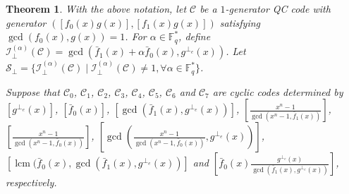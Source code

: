 \documentclass[journal]{IEEEtran}
\newtheorem{theorem}{Theorem}
\begin{document}
\begin{theorem}\label{SDQCBound} With the above notation,
	let $\mathscr{C}$ be a $1$-generator QC code with generator $(\left[f_0(x)g(x)\right],\left[f_1(x)g(x)\right])$ satisfying
 	$\gcd(f_0(x),g(x))=1$. 
  For $\alpha\in \mathbb{F}_q^*$, define $\mathcal{I}^{(\alpha)}_{\perp}(\mathscr{C})=\gcd(\bar{f}_1(x)+\alpha  \bar{f}_0(x),g^{\perp_{e}}(x))$. Let $\mathcal{S}_{\perp} =\{\mathcal{I}^{(\alpha)}_{\perp}(\mathscr{C}) \mid \mathcal{I}^{(\alpha)}_{\perp}(\mathscr{C})\ne 1, \forall\alpha\in\mathbb{F}_q^*\}$.
  
	Suppose that $\mathscr{C}_0$, $\mathscr{C}_1$, $\mathscr{C}_2$, $\mathscr{C}_3$, $\mathscr{C}_4$, $\mathscr{C}_5$, $\mathscr{C}_6$ and $\mathscr{C}_7$ are cyclic codes determined by 
 $\left[g^{\perp_{e}}(x)\right]$,
	$\left[\bar{f}_0(x)\right]$, $\left[\gcd(\bar{f}_1(x),g^{\perp_{e}}(x))\right]$,
	$\left[\frac{x^n-1}{\gcd( x^n-1,\bar{f}_1(x))}\right]$, 	$\left[\frac{x^n-1}{\gcd( x^n-1,\bar{f}_0(x))}\right]$, $\left[\gcd\left( \frac{x^n-1}{\gcd( x^n-1,\bar{f}_0(x))},g^{\perp_{e}}(x) \right)\right]$, $\left[ \operatorname{lcm}(\bar{f}_0(x),\gcd(\bar{f}_1(x),g^{\perp_{e}}(x))\right]$ and $\left[\bar{f}_0(x)\frac{g^{\perp_{e}}(x)}{\gcd(\bar{f}_1(x),g^{\perp_{e}}(x))}\right]$, respectively.


\end{theorem}
\end{document}

